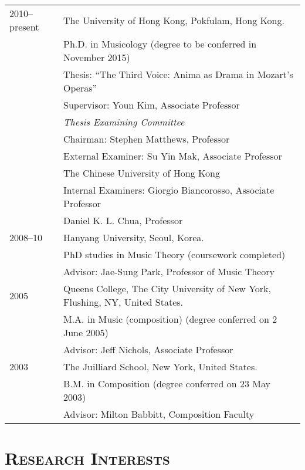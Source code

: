 \documentclass[a4,11pt,draft]{article}
\begin{document}
  \hspace*{-0.25cm}
  \begin{tabular}{p{2.5cm} l}
    2010--present & The University of Hong Kong, Pokfulam, Hong Kong.\\
    & Ph.D. in Musicology (degree to be conferred in November 2015)\\
    & Thesis: ``The Third Voice: Anima as Drama in Mozart's Operas''\\
    & Supervisor: Youn Kim, Associate Professor\\[2mm]
    & \textit{Thesis Examining Committee}\\
    & Chairman: Stephen Matthews, Professor\\
    & External Examiner: Su Yin Mak, Associate Professor\\
    & \hspace*{28.5mm} The Chinese University of Hong Kong\\
    & Internal Examiners: Giorgio Biancorosso, Associate Professor\\
    & \hspace*{29.5mm} Daniel K. L. Chua, Professor\\[2mm]
    
    2008--10 & Hanyang University, Seoul, Korea.\\
    & PhD studies in Music Theory (coursework completed)\\
		& Advisor: Jae-Sung Park, Professor of Music Theory\\[2mm]
		
		2005 & Queens College, The City University of New York, Flushing, NY, United States.\\
		& M.A. in Music (composition) (degree conferred on 2 June 2005)\\
		& Advisor: Jeff Nichols, Associate Professor\\[2mm]

    2003 & The Juilliard School, New York, United States.\\
		& B.M. in Composition (degree conferred on 23 May 2003)\\
		& Advisor: Milton Babbitt, Composition Faculty
  \end{tabular}
  
  \vspace{2.5mm}
  
  \section*{\textsc{Research Interests}}
  
\end{document}
